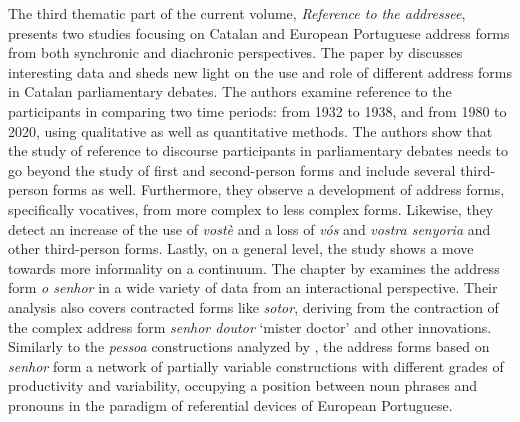\documentclass[output=paper]{langscibook}
\begin{document}
The third thematic part of the current volume, \textit{Reference to the addressee},  presents two studies focusing on Catalan and European Portuguese address forms from both synchronic and diachronic perspectives. The paper by  discusses interesting data and sheds new light on the use and role of different address forms in Catalan parliamentary debates. The authors examine reference to the participants in comparing two time periods: from 1932 to 1938, and from 1980 to 2020, using qualitative as well as quantitative methods. The authors show that the study of reference to discourse participants in parliamentary debates needs to go beyond the study of first and second-person forms and include several third-person forms as well. Furthermore, they observe a development of address forms, specifically vocatives, from more complex to less complex forms. Likewise, they detect an increase of the use of \textit{vostè} and a loss of \textit{vós} and \textit{vostra senyoria}  and other third-person forms. Lastly, on a general level, the study shows a move towards more informality on a continuum. The chapter by  examines the address form \textit{o senhor}  in a wide variety of data from an interactional perspective. Their analysis also covers contracted forms like \textit{sotor},  deriving from the contraction of the complex address form \textit{senhor doutor} ‘mister doctor’ and other innovations. Similarly to the \textit{pessoa}  constructions analyzed by , the address forms based on \textit{senhor}  form a network of partially variable constructions with different grades of productivity and variability, occupying a position between noun phrases and pronouns in the paradigm of referential devices of European Portuguese. 

\printbibliography[heading=subbibliography]
\end{document}
